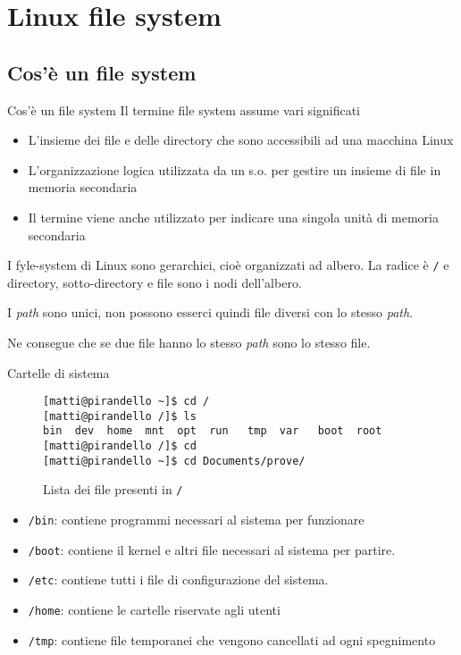 \section{Linux file system}

\subsection{Cos'è un file system}
\begin{frame}{Cos'è un file system}
  Il termine file system assume vari significati
  \begin{itemize}
    \item L'insieme dei file e delle directory che sono accessibili ad una macchina Linux
    \item L'organizzazione logica utilizzata da un s.o. per gestire un insieme di file in
memoria secondaria
    \item Il termine viene anche utilizzato per indicare una singola unità di memoria
secondaria
  \end{itemize}

  I fyle-system di Linux sono gerarchici, cioè organizzati ad albero. La radice
  è \texttt{/} e directory, sotto-directory e file sono i nodi dell'albero. \bigskip

  I \textit{path} sono unici, non possono esserci quindi file diversi con lo 
  stesso \textit{path}. \bigskip

  Ne consegue che se due file hanno lo stesso \textit{path} sono lo stesso file.
  \bigskip
\end{frame}

\begin{frame}[fragile]{Cartelle di sistema}
  \begin{figure}
    \begin{lstlisting}[basicstyle=\footnotesize]
[matti@pirandello ~]$ cd /
[matti@pirandello /]$ ls
bin  dev  home  mnt  opt  run   tmp  var   boot  root
[matti@pirandello /]$ cd
[matti@pirandello ~]$ cd Documents/prove/
    \end{lstlisting}
    \caption{Lista dei file presenti in \texttt{/}}
  \end{figure}
  \begin{itemize}
    \item \texttt{/bin}: contiene programmi necessari al sistema per funzionare
    \item \texttt{/boot}: contiene il kernel e altri file necessari al sistema
      per partire.
    \item \texttt{/etc}: contiene tutti i file di configurazione del sistema.
    \item \texttt{/home}: contiene le cartelle riservate agli utenti
    \item \texttt{/tmp}: contiene file temporanei che vengono cancellati ad ogni
      spegnimento
  \end{itemize}
\end{frame}

